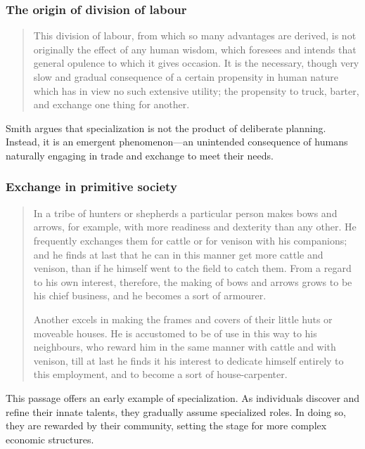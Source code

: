         \subsubsection{The origin of division of labour}

            \begin{quote}
                This division of labour, from which so many advantages are derived, is not originally the effect of any human wisdom, which foresees and intends that general opulence to which it gives occasion. It is the necessary, though very slow and gradual consequence of a certain propensity in human nature which has in view no such extensive utility; the propensity to truck, barter, and exchange one thing for another.
            \end{quote}

            Smith argues that specialization is not the product of deliberate planning. Instead, it is an emergent phenomenon—an unintended consequence of humans naturally engaging in trade and exchange to meet their needs.

        \subsubsection{Exchange in primitive society}

            \begin{quote}
                In a tribe of hunters or shepherds a particular person makes bows and arrows, for example, with more readiness and dexterity than any other. He frequently exchanges them for cattle or for venison with his companions; and he finds at last that he can in this manner get more cattle and venison, than if he himself went to the field to catch them. From a regard to his own interest, therefore, the making of bows and arrows grows to be his chief business, and he becomes a sort of armourer.

                Another excels in making the frames and covers of their little huts or moveable houses. He is accustomed to be of use in this way to his neighbours, who reward him in the same manner with cattle and with venison, till at last he finds it his interest to dedicate himself entirely to this employment, and to become a sort of house-carpenter.
            \end{quote}

            This passage offers an early example of specialization. As individuals discover and refine their innate talents, they gradually assume specialized roles. In doing so, they are rewarded by their community, setting the stage for more complex economic structures.

